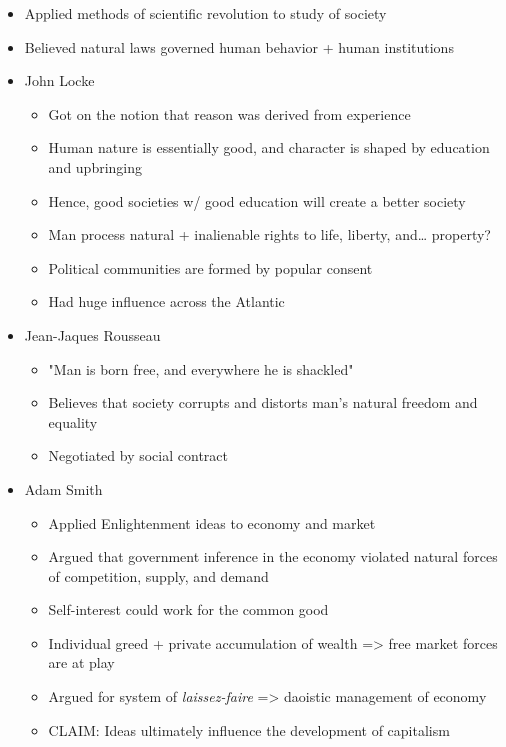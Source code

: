 \documentclass[letterpaper]{article}
\begin{document}
\begin{itemize}
\item Applied methods of scientific revolution to study of society
\item Believed natural laws governed human behavior + human institutions
\item John Locke

\begin{itemize}
\item Got on the notion that reason was derived from experience
\item Human nature is essentially good, and character is shaped by
education and upbringing
\item Hence, good societies w/ good education will create a better society
\item Man process natural + inalienable rights to life, liberty, and\ldots{}
property?
\item Political communities are formed by popular consent
\item Had huge influence across the Atlantic
\end{itemize}

\item Jean-Jaques Rousseau

\begin{itemize}
\item "Man is born free, and everywhere he is shackled"
\item Believes that society corrupts and distorts man's natural freedom
and equality
\item Negotiated by social contract
\end{itemize}

\item Adam Smith

\begin{itemize}
\item Applied Enlightenment ideas to economy and market
\item Argued that government inference in the economy violated natural
forces of competition, supply, and demand
\item Self-interest could work for the common good
\item Individual greed + private accumulation of wealth => free market
forces are at play
\item Argued for system of \emph{laissez-faire} => daoistic management of
economy
\item CLAIM: Ideas ultimately influence the development of capitalism
\end{itemize}


\end{itemize}
\end{document}

